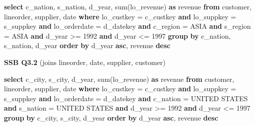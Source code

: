 \documentclass[
]{article}
\newenvironment{Shaded}{}{}
\newcommand{\DataTypeTok}[1]{\textcolor[rgb]{0.56,0.13,0.00}{#1}}
\newcommand{\DecValTok}[1]{\textcolor[rgb]{0.25,0.63,0.44}{#1}}
\newcommand{\FunctionTok}[1]{\textcolor[rgb]{0.02,0.16,0.49}{#1}}
\newcommand{\KeywordTok}[1]{\textcolor[rgb]{0.00,0.44,0.13}{\textbf{#1}}}
\newcommand{\NormalTok}[1]{#1}
\newcommand{\OperatorTok}[1]{\textcolor[rgb]{0.40,0.40,0.40}{#1}}
\newcommand{\StringTok}[1]{\textcolor[rgb]{0.25,0.44,0.63}{#1}}
\begin{document}
\begin{Shaded}
\begin{Highlighting}[]
\KeywordTok{select}\NormalTok{ c\_nation, s\_nation, d\_year, }\FunctionTok{sum}\NormalTok{(lo\_revenue) }\KeywordTok{as}\NormalTok{ revenue}
\KeywordTok{from}\NormalTok{ customer, lineorder, supplier, }\DataTypeTok{date}
\KeywordTok{where}\NormalTok{ lo\_custkey }\OperatorTok{=}\NormalTok{ c\_custkey }\KeywordTok{and}\NormalTok{ lo\_suppkey }\OperatorTok{=}\NormalTok{ s\_suppkey }\KeywordTok{and}\NormalTok{ lo\_orderdate }\OperatorTok{=}\NormalTok{ d\_datekey }\KeywordTok{and}\NormalTok{ c\_region }\OperatorTok{=} \StringTok{\textquotesingle{}ASIA\textquotesingle{}} \KeywordTok{and}\NormalTok{ s\_region }\OperatorTok{=} \StringTok{\textquotesingle{}ASIA\textquotesingle{}} \KeywordTok{and}\NormalTok{ d\_year }\OperatorTok{\textgreater{}=} \DecValTok{1992} \KeywordTok{and}\NormalTok{ d\_year }\OperatorTok{\textless{}=} \DecValTok{1997}
\KeywordTok{group} \KeywordTok{by}\NormalTok{ c\_nation, s\_nation, d\_year}
\KeywordTok{order} \KeywordTok{by}\NormalTok{ d\_year }\KeywordTok{asc}\NormalTok{, revenue }\KeywordTok{desc}
\end{Highlighting}
\end{Shaded}

\textbf{SSB Q3.2} (joins lineorder, date, supplier, customer)

\begin{Shaded}
\begin{Highlighting}[]
\KeywordTok{select}\NormalTok{ c\_city, s\_city, d\_year, }\FunctionTok{sum}\NormalTok{(lo\_revenue) }\KeywordTok{as}\NormalTok{ revenue}
\KeywordTok{from}\NormalTok{ customer, lineorder, supplier, }\DataTypeTok{date}
\KeywordTok{where}\NormalTok{ lo\_custkey }\OperatorTok{=}\NormalTok{ c\_custkey }\KeywordTok{and}\NormalTok{ lo\_suppkey }\OperatorTok{=}\NormalTok{ s\_suppkey }\KeywordTok{and}\NormalTok{ lo\_orderdate }\OperatorTok{=}\NormalTok{ d\_datekey }\KeywordTok{and}\NormalTok{ c\_nation }\OperatorTok{=} \StringTok{\textquotesingle{}UNITED STATES\textquotesingle{}} \KeywordTok{and}\NormalTok{ s\_nation }\OperatorTok{=} \StringTok{\textquotesingle{}UNITED STATES\textquotesingle{}} \KeywordTok{and}\NormalTok{ d\_year }\OperatorTok{\textgreater{}=} \DecValTok{1992} \KeywordTok{and}\NormalTok{ d\_year }\OperatorTok{\textless{}=} \DecValTok{1997}
\KeywordTok{group} \KeywordTok{by}\NormalTok{ c\_city, s\_city, d\_year}
\KeywordTok{order} \KeywordTok{by}\NormalTok{ d\_year }\KeywordTok{asc}\NormalTok{, revenue }\KeywordTok{desc}
\end{Highlighting}
\end{Shaded}
\end{document}
